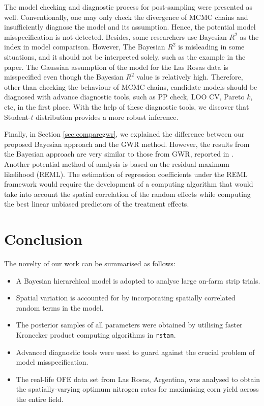 \documentclass[a4paper]{article}   	%
\newcommand{\rstan}{\texttt{rstan}}
\begin{document}
	
	
	The model checking and diagnostic process for post-sampling were presented as well. Conventionally, one may only check the divergence of MCMC chains and insufficiently diagnose the model and its assumption. Hence, the potential model misspecification is not detected. Besides, some researchers use Bayesian $R^2$ as the index in model comparison. However, The Bayesian $R^2$ is misleading in some situations, and it should not be interpreted solely, such as the example in the paper. The Gaussian assumption of the model for the Las Rosas data is misspecified even though the Bayesian $R^2$ value is relatively high. Therefore, other than checking the behaviour of MCMC chains, candidate models should be diagnosed with advance diagnostic tools, such as PP check, LOO CV, Pareto $k$, etc, in the first place. With the help of these diagnostic tools, we discover that Student-$t$ distribution provides a more robust inference. 
	
	
	
	Finally, in Section \ref{sec:comparegwr}, we explained the difference between our proposed Bayesian approach and the GWR method. However, the results from the Bayesian approach are very similar to those from GWR, reported in \textcite{Rakshit2020Novel}. Another potential method of analysis is based on the residual maximum likelihood (REML). The estimation of regression coefficients under the REML framework would require the development of a computing algorithm that would take into account the spatial correlation of the random effects while computing the best linear unbiased predictors of the treatment effects.
	
	
	\section{Conclusion}
	
	The novelty of our work can be summarised as follows:
	\begin{itemize}
		\item A Bayesian hierarchical model is adopted to analyse large on-farm strip trials.
		\item Spatial variation is accounted for by   incorporating spatially correlated random terms in the model.
		\item The posterior samples of all parameters were obtained by utilising faster Kronecker product computing algorithms in \rstan.
		\item Advanced diagnostic tools were used to guard against the crucial problem of model misspecification.
		\item The real-life OFE data set from Las Rosas, Argentina, was analysed to obtain the spatially-varying optimum nitrogen rates for maximising corn yield across the entire field.
	\end{itemize}
	
\end{document}
